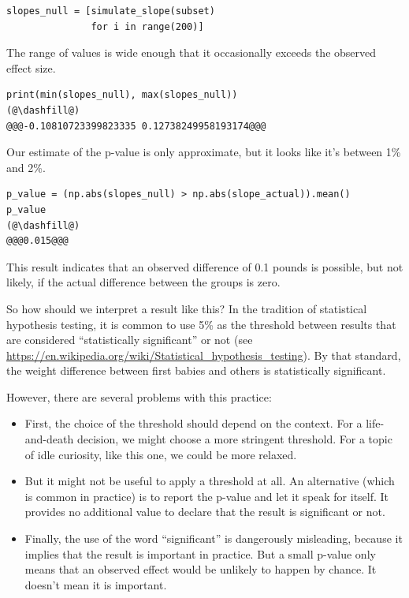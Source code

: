 \begin{lstlisting}[]
slopes_null = [simulate_slope(subset)
               for i in range(200)]
\end{lstlisting}

The range of values is wide enough that it occasionally exceeds the
observed effect size.

\begin{lstlisting}[]
print(min(slopes_null), max(slopes_null))
(@\dashfill@)
@@@-0.10810723399823335 0.12738249958193174@@@
\end{lstlisting}

Our estimate of the p-value is only approximate, but it looks like it's
between 1\% and 2\%.

\begin{lstlisting}[]
p_value = (np.abs(slopes_null) > np.abs(slope_actual)).mean()
p_value
(@\dashfill@)
@@@0.015@@@
\end{lstlisting}

This result indicates that an observed difference of 0.1 pounds is
possible, but not likely, if the actual difference between the groups is
zero.

So how should we interpret a result like this? In the tradition of
statistical hypothesis testing, it is common to use 5\% as the threshold
between results that are considered ``statistically significant'' or not
(see
\url{https://en.wikipedia.org/wiki/Statistical_hypothesis_testing}). By
that standard, the weight difference between first babies and others is
statistically significant.

However, there are several problems with this practice:

\begin{itemize}
\item
  First, the choice of the threshold should depend on the context. For a
  life-and-death decision, we might choose a more stringent threshold.
  For a topic of idle curiosity, like this one, we could be more
  relaxed.
\item
  But it might not be useful to apply a threshold at all. An alternative
  (which is common in practice) is to report the p-value and let it
  speak for itself. It provides no additional value to declare that the
  result is significant or not.
\item
  Finally, the use of the word ``significant'' is dangerously
  misleading, because it implies that the result is important in
  practice. But a small p-value only means that an observed effect would
  be unlikely to happen by chance. It doesn't mean it is important.
\end{itemize}

